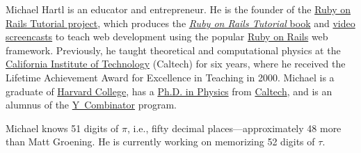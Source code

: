 \documentclass{article}
\begin{document}
Michael Hartl is an educator and entrepreneur. He is the founder of the \href{http://www.railstutorial.org/}{Ruby on Rails Tutorial project}, which produces the \href{http://www.railstutorial.org/book}{\emph{Ruby on Rails Tutorial} book} and \href{http://www.railstutorial.org/}{video screencasts} to teach web development using the popular \href{http://rubyonrails.org/}{Ruby on Rails} web framework. Previously, he taught theoretical and computational physics at the \href{http://www.caltech.edu/}{California Institute of Technology} (Caltech) for six years, where he received the Lifetime Achievement Award for Excellence in Teaching in 2000. Michael is a graduate of \href{http://college.harvard.edu/}{Harvard College}, has a \href{http://resolver.caltech.edu/CaltechETD:etd-05222003-161626}{Ph.D. in Physics} from \href{http://www.caltech.edu/}{Caltech}, and is an alumnus of the \href{http://ycombinator.com/}{Y~Combinator} program.

Michael knows 51 digits of $\pi$, i.e., fifty decimal places---approximately 48 more than Matt Groening. He is currently working on memorizing 52 digits of $\tau$.
\end{document}
